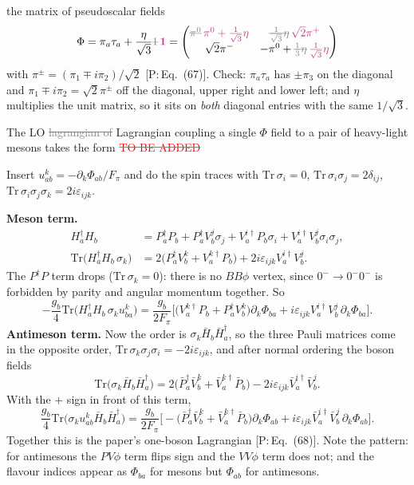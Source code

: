 \documentclass[11pt]{article}
\newcommand{\todo}{\textcolor{red}{TO BE ADDED}}
\newcommand{\tagP}[1]{\textcolor{blue!65!black}{\textsf{\small[P:\,#1]}}}
\newcommand{\ai}[1]{\textcolor{aicolor}{#1}}
\newcommand{\aifix}[2]{\textcolor{gray}{\sout{#1}} \textcolor{aicolor}{#2}}
\newcommand{\aifixm}[2]{\textcolor{gray}{\text{\sout{$#1$}}}\,\textcolor{aicolor}{#2}}
\newcommand{\ai}[1]{#1}
\newcommand{\aifix}[2]{#2}
\newcommand{\aifixm}[2]{#2}
\newenvironment{aiadd}{\par}{\par}
\begin{document}
the matrix of pseudoscalar fields
\[
	\Phi = \pi_a\tau_a + \frac{\eta}{\sqrt{3}}\aifixm{1}{\bm 1} = \begin{pmatrix}
		\aifixm{\pi^0}{\pi^0+\frac{1}{\sqrt3}\eta} & \aifixm{\frac{1}{\sqrt{3}}\eta}{\sqrt2\pi^+}          \\
		\sqrt{2}\pi^-                              & -\pi^0+\aifixm{\frac{1}{3}\eta}{\frac{1}{\sqrt3}\eta}
	\end{pmatrix}
\]
\ai{with $\pi^\pm=(\pi_1\mp i\pi_2)/\sqrt2$ \tagP{Eq.~(67)}. Check: $\pi_a\tau_a$ has $\pm\pi_3$ on the diagonal and $\pi_1\mp i\pi_2=\sqrt2\pi^\pm$ off the diagonal, upper right and lower left; and $\eta$ multiplies the unit matrix, so it sits on \emph{both} diagonal entries with the same $1/\sqrt3$.}

The LO \aifix{lagrangian of}{Lagrangian coupling} a single $\Phi$ field to \ai{a} pair of heavy-light mesons takes \ai{the} form \aifix{\todo}{}

\begin{aiadd}
	Insert $u^k_{ab}=-\partial_k\Phi_{ab}/F_\pi$ and do the spin traces with
	$\mathrm{Tr}\,\sigma_i=0$, $\mathrm{Tr}\,\sigma_i\sigma_j=2\delta_{ij}$, $\mathrm{Tr}\,\sigma_i\sigma_j\sigma_k=2i\varepsilon_{ijk}$.

	\textbf{Meson term.}
	\begin{align*}
		H_a^\dagger H_b                                & =P_a^\dagger P_b+P_a^\dagger V_b^j\sigma_j+V_a^{i\dagger}P_b\sigma_i+V_a^{i\dagger}V_b^j\sigma_i\sigma_j, \\
		\mathrm{Tr}\big(H_a^\dagger H_b\,\sigma_k\big) & =2\big(P_a^\dagger V_b^k+V_a^{k\dagger}P_b\big)+2i\varepsilon_{ijk}V_a^{i\dagger}V_b^j .
	\end{align*}
	The $P^\dagger P$ term drops ($\mathrm{Tr}\,\sigma_k=0$): there is no $BB\phi$ vertex, since $0^-\to0^-0^-$ is forbidden by parity and angular momentum together. So
	\[
		-\frac{g_b}{4}\mathrm{Tr}\big(H_a^\dagger H_b\,\sigma_ku^k_{ba}\big)
		=\frac{g_b}{2F_\pi}\Big[\big(V_a^{k\dagger}P_b+P_a^\dagger V_b^k\big)\partial_k\Phi_{ba}+i\varepsilon_{ijk}V_a^{i\dagger}V_b^j\,\partial_k\Phi_{ba}\Big].
	\]
	\textbf{Antimeson term.} Now the order is $\sigma_k\bar H_b\bar H_a^\dagger$, so the three Pauli matrices come in the opposite order, $\mathrm{Tr}\,\sigma_k\sigma_j\sigma_i=-2i\varepsilon_{ijk}$, and after normal ordering the boson fields
	\[
		\mathrm{Tr}\big(\sigma_k\bar H_b\bar H_a^\dagger\big)=2\big(\bar P_a^\dagger\bar V_b^k+\bar V_a^{k\dagger}\bar P_b\big)-2i\varepsilon_{ijk}\bar V_a^{i\dagger}\bar V_b^j .
	\]
	With the $+$ sign in front of this term,
	\[
		\frac{g_b}{4}\mathrm{Tr}\big(\sigma_ku^k_{ab}\bar H_b\bar H_a^\dagger\big)
		=\frac{g_b}{2F_\pi}\Big[-\big(\bar P_a^\dagger\bar V_b^k+\bar V_a^{k\dagger}\bar P_b\big)\partial_k\Phi_{ab}+i\varepsilon_{ijk}\bar V_a^{i\dagger}\bar V_b^j\,\partial_k\Phi_{ab}\Big].
	\]
	Together this is the paper's one-boson Lagrangian \tagP{Eq.~(68)}. Note the pattern: for antimesons the $PV\phi$ term flips sign and the $VV\phi$ term does not; and the flavour indices appear as $\Phi_{ba}$ for mesons but $\Phi_{ab}$ for antimesons.
\end{aiadd}
\end{document}
